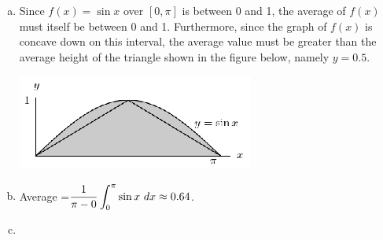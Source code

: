 \begin{enumerate}[1.]
\begin{multicols}{2}
  \begin{Solution}
    \begin{enumerate}[(a)]
    \item Since $f(x) = \sin x$ over $[0, \pi]$ is between 0 and 1,
      the average of $f(x)$ must itself be between 0 and
      1. Furthermore, since the graph of $f(x)$ is concave down on
      this interval, the average value must be greater than the
      average height of the triangle shown in the figure below, namely
      $y = 0.5$.

\includegraphics[width=0.7\linewidth]{graphics/Week06_AverageValue/sin_average_solution}

\item Average =$\displaystyle \frac{1 }{\pi-0}\int^\pi_0 \sin x ~dx \approx 0.64$.

\item 


\end{enumerate}
\end{Solution}
\end{multicols}
\end{enumerate}
